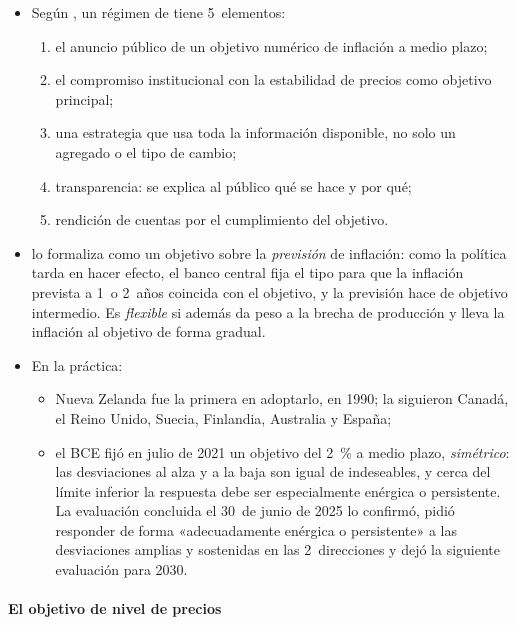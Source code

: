 \documentclass[11pt]{article}
\begin{document}
\begin{itemize}
\item Según \textcite{Mishkin1999International}, un régimen de  tiene 5~elementos:
  \begin{enumerate}
  \item el anuncio público de un objetivo numérico de inflación a medio plazo;
  \item el compromiso institucional con la estabilidad de precios como objetivo principal;
  \item una estrategia que usa toda la información disponible, no solo un agregado o el tipo de cambio;
  \item transparencia: se explica al público qué se hace y por qué;
  \item rendición de cuentas por el cumplimiento del objetivo.
  \end{enumerate}
\item \textcite{Svensson1997Inflation} lo formaliza como un objetivo sobre la \emph{previsión} de inflación: como la política tarda en hacer efecto, el banco central fija el tipo para que la inflación prevista a 1~o 2~años coincida con el objetivo, y la previsión hace de objetivo intermedio. Es \emph{flexible} si además da peso a la brecha de producción y lleva la inflación al objetivo de forma gradual\nocite{Svensson1999Inflation}.
\item En la práctica:
  \begin{itemize}
  \item Nueva Zelanda fue la primera en adoptarlo, en 1990; la siguieron Canadá, el Reino Unido, Suecia, Finlandia, Australia y España\nocite{BernankeEtAl1997NuevaZelanda,Mishkin1999International};
  \item el BCE fijó en julio de 2021 un objetivo del 2~\% a medio plazo, \emph{simétrico}: las desviaciones al alza y a la baja son igual de indeseables, y cerca del límite inferior la respuesta debe ser especialmente enérgica o persistente\nocite{BCE2021Estrategia}. La evaluación concluida el 30~de junio de 2025 lo confirmó, pidió responder de forma «adecuadamente enérgica o persistente» a las desviaciones amplias y sostenidas en las 2~direcciones y dejó la siguiente evaluación para 2030\nocite{BCE2025Estrategia,BCE2025Evaluacion,BdE2026EstrategiaBCE}.
  \end{itemize}
\end{itemize}

\paragraph{El objetivo de nivel de precios}
\end{document}
